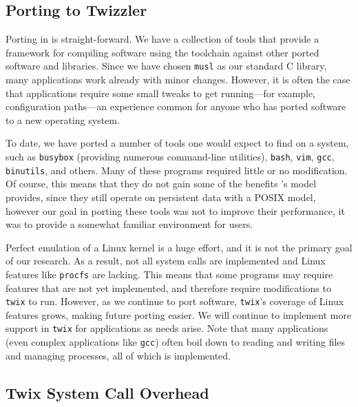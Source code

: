 \subsection{Porting to Twizzler}

Porting in \Twizzler is straight-forward. We have a collection of tools that provide a
framework for compiling software using the \Twizzler toolchain against other ported software and
libraries. Since we have chosen \texttt{musl} as our standard C library, many applications work
already with minor changes. However, it is often the case that applications require
some small tweaks to get running---for example, configuration paths---an experience common for anyone who has ported software to a new
operating system.

To date, we have ported a number of tools one would expect to find on a \unix system, such as
\texttt{busybox} (providing numerous command-line utilities), \texttt{bash}, \texttt{vim},
\texttt{gcc}, \texttt{binutils}, and others. Many of these programs required little or no
modification. Of course, this means that they do not gain some of the benefits \Twizzler's model
provides, since they still operate on persistent data with a POSIX model, however our goal in
porting these tools was not to improve their performance, it was to provide a somewhat familiar
environment for users.

Perfect emulation of a Linux kernel is a huge effort, and it is not the primary goal of
our research. As a result, not all system calls are implemented and Linux features like
\texttt{procfs} are lacking. This means that some programs may require features that are not yet
implemented, and therefore require modifications to \texttt{twix} to run. However, as we continue to
port software, \texttt{twix}'s coverage of Linux features grows, making future porting easier. We
will continue to implement more support in \texttt{twix} for applications as needs arise. Note that
many applications (even complex applications like \texttt{gcc}) often boil down to reading and
writing files and managing processes, all of which is implemented.

\subsection{Twix System Call Overhead}

